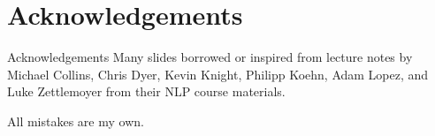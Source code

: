 
\section*{Acknowledgements}

\begin{frame}
\centering
\begin{alertblock}{Acknowledgements}
Many slides borrowed or inspired from lecture notes by Michael Collins, Chris Dyer, Kevin Knight, Philipp Koehn, Adam Lopez, and Luke Zettlemoyer from their NLP course materials. 

\bigskip

All mistakes are my own.
\end{alertblock}
\end{frame}


